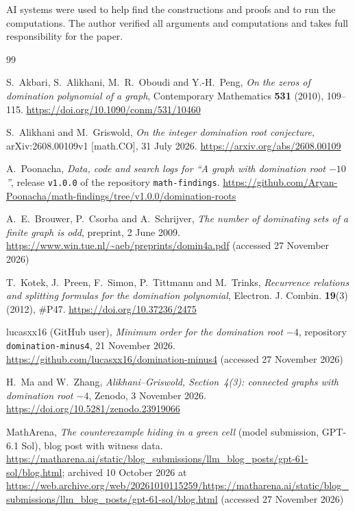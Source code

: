 \documentclass[11pt]{amsart}
\theoremstyle{remark}
\begin{document}
AI systems were used to help find the constructions and proofs and to run the
computations. The author verified all arguments and computations and takes full
responsibility for the paper.

\begin{thebibliography}{99}

S.~Akbari, S.~Alikhani, M.~R.~Oboudi and Y.-H.~Peng,
\emph{On the zeros of domination polynomial of a graph},
Contemporary Mathematics \textbf{531} (2010), 109--115.
\url{https://doi.org/10.1090/conm/531/10460}

S.~Alikhani and M.~Griswold,
\emph{On the integer domination root conjecture},
arXiv:2608.00109v1 [math.CO], 31 July 2026.
\url{https://arxiv.org/abs/2608.00109}

A.~Poonacha, \emph{Data, code and search logs for ``A graph with domination
root $-10$''}, release
\texttt{v1.0.0} of the repository \texttt{math-findings}.
\url{https://github.com/Aryan-Poonacha/math-findings/tree/v1.0.0/domination-roots}

A.~E.~Brouwer, P.~Csorba and A.~Schrijver,
\emph{The number of dominating sets of a finite graph is odd},
preprint, 2 June 2009.
\url{https://www.win.tue.nl/~aeb/preprints/domin4a.pdf} (accessed 27 November 2026)

T.~Kotek, J.~Preen, F.~Simon, P.~Tittmann and M.~Trinks,
\emph{Recurrence relations and splitting formulas for the domination polynomial},
Electron. J. Combin. \textbf{19}(3) (2012), \#P47.
\url{https://doi.org/10.37236/2475}

lucasxx16 (GitHub user),
\emph{Minimum order for the domination root $-4$}, repository
\texttt{domination-minus4}, 21 November 2026.
\url{https://github.com/lucasxx16/domination-minus4} (accessed 27 November 2026)

H.~Ma and W.~Zhang,
\emph{Alikhani--Griswold, Section~4(3): connected graphs with domination root $-4$},
Zenodo, 3 November 2026.
\url{https://doi.org/10.5281/zenodo.23919066}

MathArena,
\emph{The counterexample hiding in a green cell} (model submission, GPT-6.1 Sol),
blog post with witness data.
\url{https://matharena.ai/static/blog_submissions/llm_blog_posts/gpt-61-sol/blog.html};
archived 10 October 2026 at
\url{https://web.archive.org/web/20261010115259/https://matharena.ai/static/blog_submissions/llm_blog_posts/gpt-61-sol/blog.html}
(accessed 27 November 2026)


\end{thebibliography}
\end{document}
